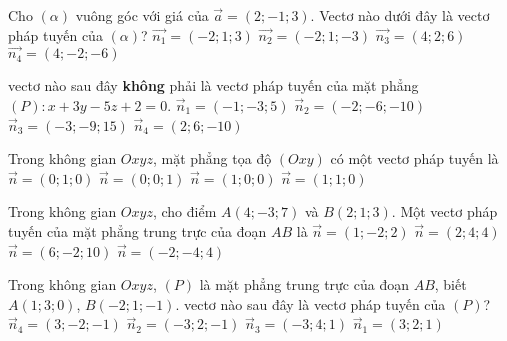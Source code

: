 \begin{ex}
	Cho $(\alpha)$ vuông góc với giá của $\vec{a}=(2;-1;3)$. Vectơ nào dưới đây là vectơ pháp tuyến của $(\alpha)$?
	\choice
	{$\vec{n_1}=(-2;1;3)$}
	{\True $\vec{n_2}=(-2;1;-3)$}
	{$\vec{n_3}=(4;2;6)$}
	{$\vec{n_4}=(4;-2;-6)$}
\end{ex}

\begin{ex}%
	vectơ nào sau đây \textbf{không} phải là vectơ pháp tuyến của mặt phẳng $(P):x+3y-5z+2=0$.
	\choice
	{$\overrightarrow{n}_1=(-1;-3;5)$}
	{\True $\overrightarrow{n}_2=(-2;-6;-10)$}
	{$\overrightarrow{n}_3=(-3;-9;15)$}
	{$\overrightarrow{n}_4=(2;6;-10)$}
\end{ex}

\begin{ex}
	Trong không gian  $Oxyz$, mặt phẳng tọa độ $(Oxy)$ có một vectơ pháp tuyến là
	\choice
	{$\overrightarrow{n}=(0;1;0)$}
	{\True $\overrightarrow{n}=(0;0;1)$}
	{$\overrightarrow{n}=(1;0;0)$}
	{$\overrightarrow{n}=(1;1;0)$}
\end{ex}

\begin{ex}
	Trong không gian $Oxyz$, cho điểm $A(4;-3;7)$ và $B(2;1;3)$. Một vectơ pháp tuyến của mặt phẳng trung trực của đoạn $AB$ là
	\choice
	{\True $\vec{n}=(1;-2;2)$}
	{$\vec{n}=(2;4;4)$}
	{$\vec{n}=(6;-2;10)$}
	{$\vec{n}=(-2;-4;4)$}
\end{ex}

\begin{ex}%
	Trong không gian $Oxyz$, $(P)$ là mặt phẳng trung trực của đoạn $AB$, biết $A(1;3;0)$, $B(-2;1;-1)$. vectơ nào sau đây là vectơ pháp tuyến của $(P)$?
	\choice
	{$\overrightarrow{n}_4=(3;-2;-1)$}
	{$\overrightarrow{n}_2=(-3;2;-1)$}
	{$\overrightarrow{n}_3=(-3;4;1)$}
	{\True $\overrightarrow{n}_1=(3;2;1)$}
\end{ex}

